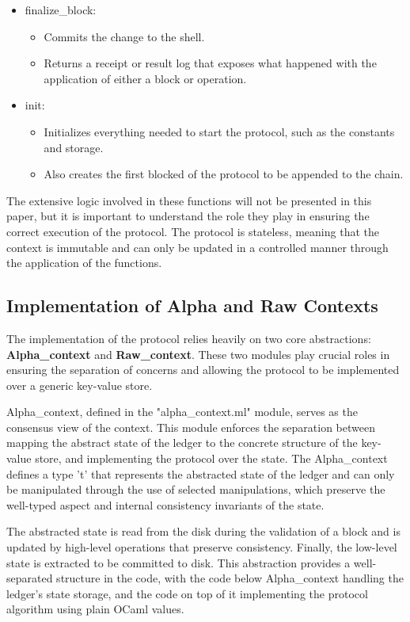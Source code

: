 \begin{itemize}
        \item finalize\_block:
        \begin{itemize}
            \item Commits the change to the shell.
            \item Returns a receipt or result log that exposes what happened with the application of either a block or operation.
        \end{itemize}
    \item init:
        \begin{itemize}
            \item Initializes everything needed to start the protocol, such as the constants and storage.
            \item Also creates the first blocked of the protocol to be appended to the chain.
        \end{itemize}
    \end{itemize}

The extensive logic involved in these functions will not be presented in this paper, but it is important to understand the role they play in ensuring the correct execution of the protocol. The protocol is stateless, meaning that the context is immutable and can only be updated in a controlled manner through the application of the functions.


\subsection*{Implementation of Alpha and Raw Contexts}

The implementation of the protocol relies heavily on two core abstractions: \textbf{Alpha\_context} and \textbf{Raw\_context}. These two modules play crucial roles in ensuring the separation of concerns and allowing the protocol to be implemented over a generic key-value store.

Alpha\_context, defined in the "alpha\_context.ml" module, serves as the consensus view of the context. This module enforces the separation between mapping the abstract state of the ledger to the concrete structure of the key-value store, and implementing the protocol over the state. The Alpha\_context defines a type 't' that represents the abstracted state of the ledger and can only be manipulated through the use of selected manipulations, which preserve the well-typed aspect and internal consistency invariants of the state.

The abstracted state is read from the disk during the validation of a block and is updated by high-level operations that preserve consistency. Finally, the low-level state is extracted to be committed to disk. This abstraction provides a well-separated structure in the code, with the code below Alpha\_context handling the ledger’s state storage, and the code on top of it implementing the protocol algorithm using plain OCaml values.

